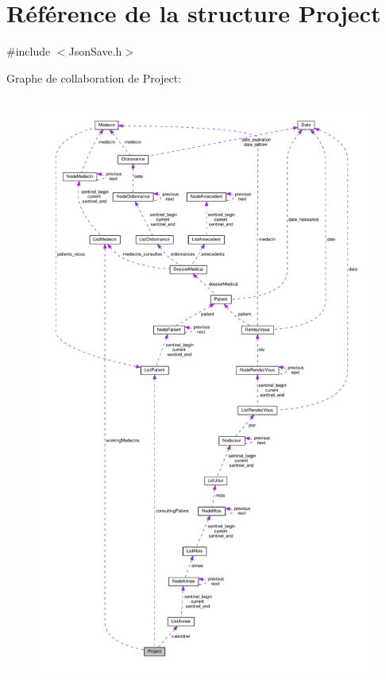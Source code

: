 \hypertarget{struct_project}{\section{Référence de la structure Project}
\label{struct_project}
}


{\ttfamily \#include $<$Json\-Save.\-h$>$}



Graphe de collaboration de Project\-:
\nopagebreak
\begin{figure}[H]
\begin{center}
\leavevmode
\includegraphics[height=550pt]{struct_project__coll__graph}
\end{center}
\end{figure}

